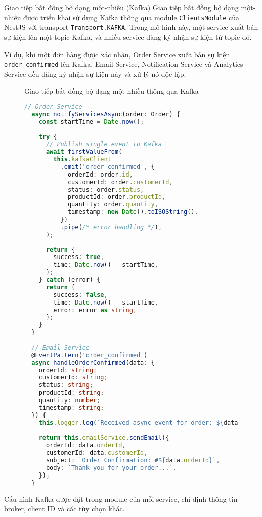 Giao tiếp bất đồng bộ dạng một-nhiều (Kafka)
Giao tiếp bất đồng bộ dạng một-nhiều được triển khai sử dụng Kafka thông qua module \texttt{ClientsModule} của NestJS với transport \texttt{Transport.KAFKA}. Trong mô hình này, một service xuất bản sự kiện lên một topic Kafka, và nhiều service đăng ký nhận sự kiện từ topic đó.

Ví dụ, khi một đơn hàng được xác nhận, Order Service xuất bản sự kiện \texttt{order\_confirmed} lên Kafka. Email Service, Notification Service và Analytics Service đều đăng ký nhận sự kiện này và xử lý nó độc lập.

\begin{figure}[H]{Giao tiếp bất đồng bộ dạng một-nhiều thông qua Kafka}
  \centering
  \begin{minipage}{\textwidth}
    \begin{lstlisting}[language=Typescript, basicstyle=\scriptsize\ttfamily]
  // Order Service
  async notifyServicesAsync(order: Order) {
    const startTime = Date.now();
  
    try {
      // Publish single event to Kafka
      await firstValueFrom(
        this.kafkaClient
          .emit('order_confirmed', {
            orderId: order.id,
            customerId: order.customerId,
            status: order.status,
            productId: order.productId,
            quantity: order.quantity,
            timestamp: new Date().toISOString(),
          })
          .pipe(/* error handling */),
      );
  
      return {
        success: true,
        time: Date.now() - startTime,
      };
    } catch (error) {
      return {
        success: false,
        time: Date.now() - startTime,
        error: error as string,
      };
    }
  }
  
  // Email Service
  @EventPattern('order_confirmed')
  async handleOrderConfirmed(data: {
    orderId: string;
    customerId: string;
    status: string;
    productId: string;
    quantity: number;
    timestamp: string;
  }) {
    this.logger.log(`Received async event for order: ${data.orderId}`);
  
    return this.emailService.sendEmail({
      orderId: data.orderId,
      customerId: data.customerId,
      subject: `Order Confirmation: #${data.orderId}`,
      body: `Thank you for your order...`,
    });
  }
  \end{lstlisting}
  \end{minipage}
\end{figure}

Cấu hình Kafka được đặt trong module của mỗi service, chỉ định thông tin broker, client ID và các tùy chọn khác.

